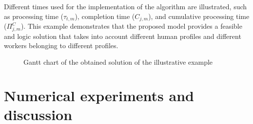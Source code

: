 \documentclass[review,12pt, 3p, times]{elsarticle}
\begin{document}
Different times used for the implementation of the algorithm are illustrated, such as processing time ($\tau_{t,m}$), completion time ($C_{j,m}$), and cumulative processing time ($\Pi^C_{j,m}$). This example demonstrates that the proposed model provides a feasible and logic solution that takes into account different human profiles and different workers belonging to different profiles.  
					
\begin{figure}[htbp]
	\centering
	\caption{Gantt chart of the obtained solution of the illustrative example}
	\label{fig:Ex_p4}
\end{figure}
									
\section{Numerical experiments and discussion}\label{sec:Exp_dis}
\end{document}
